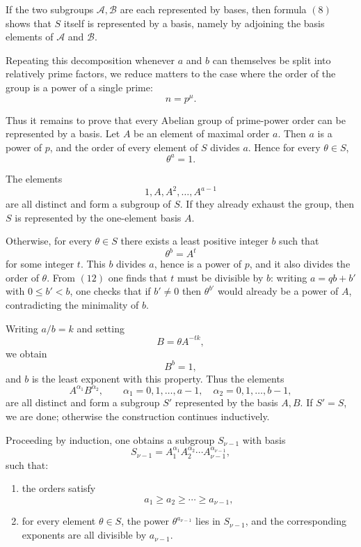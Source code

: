 \documentclass[11pt,a4paper]{book}
\begin{document}
If the two subgroups \(\mathcal A,\mathcal B\) are each represented by bases, then formula \((8)\) shows that \(S\) itself is represented by a basis, namely by adjoining the basis elements of \(\mathcal A\) and \(\mathcal B\).

Repeating this decomposition whenever \(a\) and \(b\) can themselves be split into relatively prime factors, we reduce matters to the case where the order of the group is a power of a single prime:
\[
n=p^\mu.
\tag{9}
\]

Thus it remains to prove that every Abelian group of prime-power order can be represented by a basis. Let \(A\) be an element of maximal order \(a\). Then \(a\) is a power of \(p\), and the order of every element of \(S\) divides \(a\). Hence for every \(\theta\in S\),
\[
\theta^a=1.
\tag{10}
\]

The elements
\[
1,A,A^2,\dots,A^{a-1}
\tag{11}
\]
are all distinct and form a subgroup of \(S\). If they already exhaust the group, then \(S\) is represented by the one-element basis \(A\).

Otherwise, for every \(\theta\in S\) there exists a least positive integer \(b\) such that
\[
\theta^b=A^t
\tag{12}
\]
for some integer \(t\). This \(b\) divides \(a\), hence is a power of \(p\), and it also divides the order of \(\theta\). From \((12)\) one finds that \(t\) must be divisible by \(b\): writing \(a=qb+b'\) with \(0\leq b'<b\), one checks that if \(b'\neq 0\) then \(\theta^{b'}\) would already be a power of \(A\), contradicting the minimality of \(b\).

Writing \(a/b=k\) and setting
\[
B=\theta A^{-tk},
\tag{13}
\]
we obtain
\[
B^b=1,
\tag{14}
\]
and \(b\) is the least exponent with this property. Thus the elements
\[
A^{\alpha_1}B^{\alpha_2},
\qquad
\alpha_1=0,1,\dots,a-1,\quad
\alpha_2=0,1,\dots,b-1,
\tag{15}
\]
are all distinct and form a subgroup \(S'\) represented by the basis \(A,B\). If \(S'=S\), we are done; otherwise the construction continues inductively.

Proceeding by induction, one obtains a subgroup \(S_{\nu-1}\) with basis
\[
S_{\nu-1}=A_1^{\alpha_1}A_2^{\alpha_2}\cdots A_{\nu-1}^{\alpha_{\nu-1}},
\tag{16}
\]
such that:
\begin{enumerate}
\item the orders satisfy
\[
a_1\geq a_2\geq \cdots\geq a_{\nu-1},
\]
\item for every element \(\theta\in S\), the power \(\theta^{a_{\nu-1}}\) lies in \(S_{\nu-1}\), and the corresponding exponents are all divisible by \(a_{\nu-1}\).
\end{enumerate}
\end{document}
